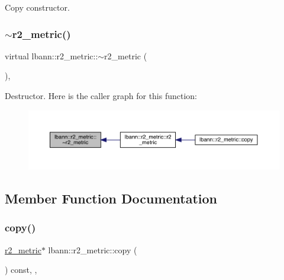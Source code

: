 Copy constructor. \mbox{\label{classlbann_1_1r2__metric_a9f2d864400bc44be329f7caf6d98cf01}} 
\subsubsection{\texorpdfstring{$\sim$r2\+\_\+metric()}{~r2\_metric()}}
{\footnotesize\ttfamily virtual lbann\+::r2\+\_\+metric\+::$\sim$r2\+\_\+metric (\begin{DoxyParamCaption}{ }\end{DoxyParamCaption})\hspace{0.3cm}{\ttfamily [virtual]}, {\ttfamily [default]}}

Destructor. Here is the caller graph for this function\+:\nopagebreak
\begin{figure}[H]
\begin{center}
\leavevmode
\includegraphics[width=350pt]{classlbann_1_1r2__metric_a9f2d864400bc44be329f7caf6d98cf01_icgraph}
\end{center}
\end{figure}


\subsection{Member Function Documentation}
\mbox{\label{classlbann_1_1r2__metric_a2536209f1d575b639ab351854d54f207}} 
\subsubsection{\texorpdfstring{copy()}{copy()}}
{\footnotesize\ttfamily \hyperlink{classlbann_1_1r2__metric}{r2\+\_\+metric}$\ast$ lbann\+::r2\+\_\+metric\+::copy (\begin{DoxyParamCaption}{ }\end{DoxyParamCaption}) const\hspace{0.3cm}{\ttfamily [inline]}, {\ttfamily [override]}, {\ttfamily [virtual]}}

